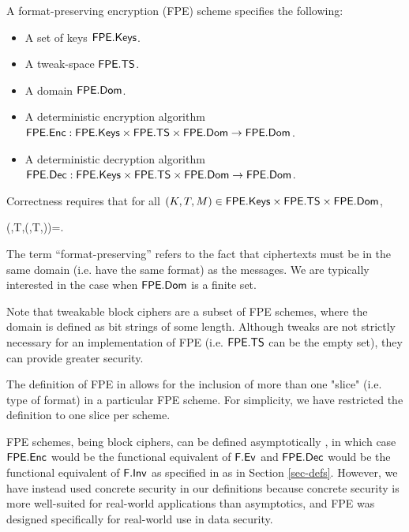 
A format-preserving encryption (FPE) scheme specifies the following: \cite{EPRINT:BRRS09}
\begin{itemize}
	\item A set of keys $\mathsf{FPE}.\mathsf{Keys}$.
	\item A tweak-space $\mathsf{FPE}.\mathsf{TS}$.
	\item A domain $\mathsf{FPE}.\mathsf{Dom}$.
	\item A deterministic encryption algorithm $\mathsf{FPE}.\mathsf{Enc}:\mathsf{FPE}.\mathsf{Keys}\times\mathsf{FPE}.\mathsf{TS}\times\mathsf{FPE}.\mathsf{Dom}\to\mathsf{FPE}.\mathsf{Dom}$.
	\item A deterministic decryption algorithm $\mathsf{FPE}.\mathsf{Dec}:\mathsf{FPE}.\mathsf{Keys}\times\mathsf{FPE}.\mathsf{TS}\times\mathsf{FPE}.\mathsf{Dom}\to\mathsf{FPE}.\mathsf{Dom}$.
\end{itemize}
Correctness requires that for all $(K,T,M)\in\mathsf{FPE}.\mathsf{Keys}\times\mathsf{FPE}.\mathsf{TS}\times\mathsf{FPE}.\mathsf{Dom}$,
\begin{newmath}
	\Dec{\FPE}(\key,T,\Enc{\FPE}(\key,T,\msg))=\msg.
\end{newmath}

The term ``format-preserving'' refers to the fact that ciphertexts must be in the same domain (i.e. have the same format) as the messages. We are typically interested in the case when $\mathsf{FPE}.\mathsf{Dom}$ is a finite set.

Note that tweakable block ciphers are a subset of FPE schemes, where the domain is defined as bit strings of some length. Although tweaks are not strictly necessary for an implementation of FPE (i.e. $\mathsf{FPE}.\mathsf{TS}$ can be the empty set), they can provide greater security. \

The definition of FPE in \cite{EPRINT:BRRS09} allows for the inclusion of more than one "slice" (i.e. type of format) in a particular FPE scheme. For simplicity, we have restricted the definition to one slice per scheme. \

FPE schemes, being block ciphers, can be defined asymptotically \cite{EPRINT:BRRS09}, in which case $\mathsf{FPE}.\mathsf{Enc}$ would be the functional equivalent of $\mathsf{F}.\mathsf{Ev}$ and $\mathsf{FPE}.\mathsf{Dec}$ would be the functional equivalent of $\mathsf{F}.\mathsf{Inv}$ as specified in as in Section \ref{sec-defs}. However, we have instead used concrete security in our definitions because concrete security is more well-suited for real-world applications than asymptotics, and FPE was designed specifically for real-world use in data security.
